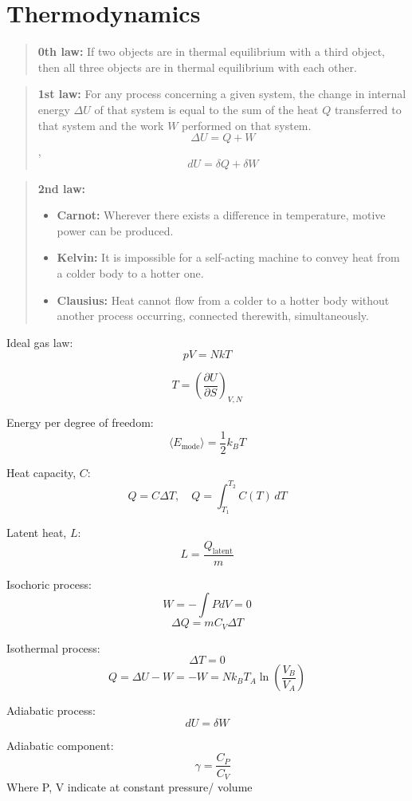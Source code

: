 \documentclass[12pt,a4paper]{article}
\begin{document}
	
\section*{Thermodynamics}

\begin{quote}
\textbf{0th law:} 
If two objects are in thermal equilibrium with a third object, then all three objects are in thermal equilibrium with each other.
\end{quote}
\begin{quote}
\textbf{1st law:} 
For any process concerning a given system, the change in internal energy \(\Delta U\) of that system is equal to the sum of the heat \( Q \) transferred to that system and the work \( W \) performed on that system.
\[ \Delta U = Q + W \] , \[ dU = \delta Q + \delta W\]
\end{quote}

\begin{quote}
\textbf{2nd law:} 
\begin{itemize}
	\item \textbf{Carnot:} Wherever there exists a difference in temperature, motive power can be produced.
	\item \textbf{Kelvin:} It is impossible for a self-acting machine to convey heat from a colder body to a hotter one.
	\item \textbf{Clausius:} Heat cannot flow from a colder to a hotter body without another process occurring, connected therewith, simultaneously.
\end{itemize}
\end{quote}

Ideal gas law: \[ pV = NkT\]

\[
T = \left( \frac{\partial U}{\partial S} \right)_{V, N}
\]

Energy per degree of freedom: \[ \langle E_\text{mode} \rangle = \frac{1}{2} k_B T \]


Heat capacity, $C$: \[ Q = C \Delta T, \quad Q = \int_{T_1}^{T_2} C(T) \, dT \]

Latent heat, $L$: \[ L  = \frac{Q_\text{latent}}{m} \]


Isochoric process: \[ W = - \int P dV = 0\]
\[ \Delta Q = m C_V \Delta T\]

Isothermal process: \[ \Delta T = 0\]
\[ Q = \Delta U - W = - W = N k_B T_A \ln (\frac{V_B}{V_A})\]

Adiabatic process: \[ dU = \delta W\]

Adiabatic component: \[ \quad \gamma = \frac{C_P}{C_V} \]
Where P, V indicate at constant pressure/ volume
\end{document}

